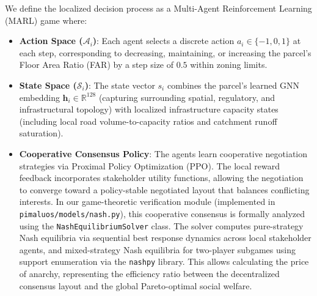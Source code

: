 \documentclass[final,3p,times]{elsarticle}
\begin{document}
We define the localized decision process as a Multi-Agent Reinforcement Learning (MARL) game where:
\begin{itemize}
    \item \textbf{Action Space ($\mathcal{A}_i$)}: Each agent selects a discrete action $a_i \in \{-1, 0, 1\}$ at each step, corresponding to decreasing, maintaining, or increasing the parcel's Floor Area Ratio (FAR) by a step size of $0.5$ within zoning limits.
    \item \textbf{State Space ($\mathcal{S}_i$)}: The state vector $s_i$ combines the parcel's learned GNN embedding $\mathbf{h}_i \in \mathbb{R}^{128}$ (capturing surrounding spatial, regulatory, and infrastructural topology) with localized infrastructure capacity states (including local road volume-to-capacity ratios and catchment runoff saturation).
    \item \textbf{Cooperative Consensus Policy}: The agents learn cooperative negotiation strategies via Proximal Policy Optimization (PPO). The local reward feedback incorporates stakeholder utility functions, allowing the negotiation to converge toward a policy-stable negotiated layout that balances conflicting interests. In our game-theoretic verification module (implemented in \texttt{pimaluos/models/nash.py}), this cooperative consensus is formally analyzed using the \texttt{NashEquilibriumSolver} class. The solver computes pure-strategy Nash equilibria via sequential best response dynamics across local stakeholder agents, and mixed-strategy Nash equilibria for two-player subgames using support enumeration via the \texttt{nashpy} library. This allows calculating the price of anarchy, representing the efficiency ratio between the decentralized consensus layout and the global Pareto-optimal social welfare.
\end{itemize}
\end{document}
